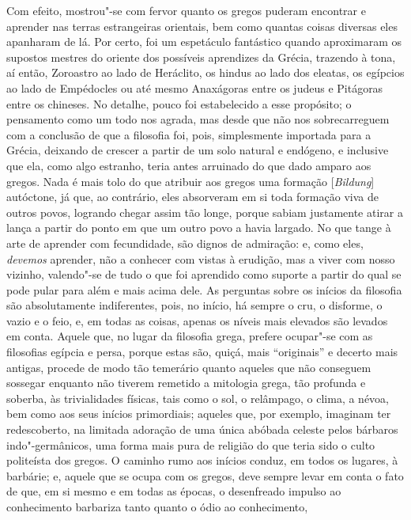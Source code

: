 Com efeito, mostrou"-se com fervor quanto os gregos puderam encontrar e
aprender nas terras estrangeiras orientais, bem como quantas coisas
diversas eles apanharam de lá. Por certo, foi um espetáculo fantástico
quando aproximaram os supostos mestres do oriente dos possíveis
aprendizes da Grécia, trazendo à tona, aí então, Zoroastro ao lado de
Heráclito, os hindus ao lado dos eleatas, os egípcios ao lado de
Empédocles ou até mesmo Anaxágoras entre os judeus e Pitágoras entre os
chineses. No detalhe, pouco foi estabelecido a esse propósito; o pensamento como um todo nos agrada, mas desde que não nos sobrecarreguem com
a conclusão de que a filosofia foi, pois, simplesmente importada para a
Grécia, deixando de crescer a partir de um solo natural e endógeno, e
inclusive que ela, como algo estranho, teria antes arruinado do que
dado amparo aos gregos. Nada é mais tolo do que atribuir aos gregos uma
formação [\textit{Bildung}] autóctone, já que, ao contrário, 
eles absorveram em si toda formação viva de outros povos, logrando chegar assim
tão longe, porque sabiam justamente atirar a lança a partir do ponto em
que um outro povo a havia largado. No que tange à arte de aprender com
fecundidade, são dignos de admiração: e, como eles, \textit{devemos}
aprender, não a conhecer com vistas à erudição, mas a viver com nosso
vizinho, valendo"-se de tudo o que foi aprendido como suporte a partir
do qual se pode pular para além e mais acima dele. As perguntas sobre \label{perguntassobreosinicios}
os inícios da filosofia são absolutamente indiferentes, pois, no
início, há sempre o cru, o disforme, o vazio e o feio, e, em todas as
coisas, apenas os níveis mais elevados são levados em conta.
Aquele que, no lugar da filosofia grega, prefere ocupar"-se com as
filosofias egípcia e persa, porque estas são, quiçá, mais ``originais'' e
decerto mais antigas, procede de modo tão temerário quanto aqueles que
não conseguem sossegar enquanto não tiverem remetido a mitologia grega,
tão profunda e soberba, às trivialidades físicas, tais como o sol, o
relâmpago, o clima, a névoa, bem como aos seus inícios primordiais;
aqueles que, por exemplo, imaginam ter redescoberto, na limitada
adoração de uma única abóbada celeste pelos bárbaros indo"-germânicos,
uma forma mais pura de religião do que teria sido o culto politeísta
dos gregos. O caminho rumo aos inícios conduz, em todos os lugares, à
barbárie; e, aquele que se ocupa com os gregos, deve sempre levar em
conta o fato de que, em si mesmo e em todas as épocas, o desenfreado
impulso ao conhecimento barbariza tanto quanto o ódio ao conhecimento,
